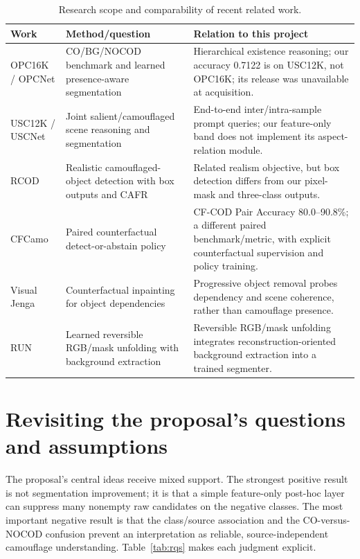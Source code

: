 \documentclass[10pt,a4paper]{article}
\begin{document}
\begin{table}[htbp]
\centering
\small\caption{Research scope and comparability of recent related work.}
\label{tab:literature}
\begin{tabularx}{\textwidth}{L{2.5cm} L{4.1cm} Y}
\toprule
\textbf{Work} & \textbf{Method/question} & \textbf{Relation to this project} \\
\midrule
OPC16K / OPCNet & CO/BG/NOCOD benchmark and learned presence-aware segmentation & Hierarchical existence reasoning; our accuracy 0.7122 is on USC12K, not OPC16K; its release was unavailable at acquisition. \\
USC12K / USCNet & Joint salient/camouflaged scene reasoning and segmentation & End-to-end inter/intra-sample prompt queries; our feature-only band does not implement its aspect-relation module. \\
RCOD & Realistic camouflaged-object detection with box outputs and CAFR & Related realism objective, but box detection differs from our pixel-mask and three-class outputs. \\
CFCamo & Paired counterfactual detect-or-abstain policy & CF-COD Pair Accuracy 80.0--90.8\%; a different paired benchmark/metric, with explicit counterfactual supervision and policy training. \\
Visual Jenga & Counterfactual inpainting for object dependencies & Progressive object removal probes dependency and scene coherence, rather than camouflage presence. \\
RUN & Learned reversible RGB/mask unfolding with background extraction & Reversible RGB/mask unfolding integrates reconstruction-oriented background extraction into a trained segmenter. \\
\bottomrule
\end{tabularx}
\end{table}

\section{Revisiting the proposal's questions and assumptions}
The proposal's central ideas receive mixed support. The strongest positive result is not segmentation improvement; it is that a simple feature-only post-hoc layer can suppress many nonempty raw candidates on the negative classes. The most important negative result is that the class/source association and the CO-versus-NOCOD confusion prevent an interpretation as reliable, source-independent camouflage understanding. Table~\ref{tab:rqs} makes each judgment explicit.

\end{document}
